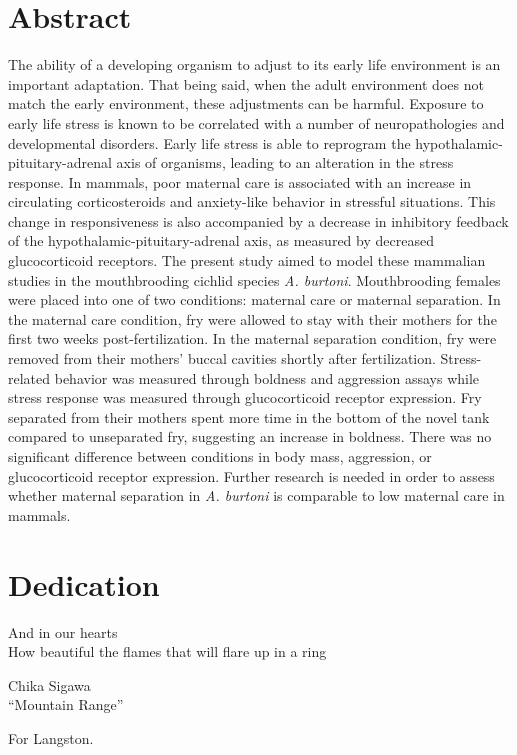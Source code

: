 \documentclass[12pt,twoside]{reedthesis}
\begin{document}
    \tableofcontents
    \listoftables
    \listoffigures

    \chapter*{Abstract}
	The ability of a developing organism to adjust to its early life environment is an
  important adaptation. That being said, when the adult environment does not
  match the early environment, these adjustments can be harmful. Exposure to
  early life stress is known to be correlated with a number of neuropathologies
  and developmental disorders. Early life stress is able to
  reprogram the hypothalamic-pituitary-adrenal axis of organisms, leading to an
  alteration in the stress response. In mammals, poor maternal care is associated
  with an increase in circulating corticosteroids and anxiety-like behavior in stressful situations. This change in
  responsiveness is also accompanied by a decrease in inhibitory feedback of the
  hypothalamic-pituitary-adrenal axis, as measured by decreased glucocorticoid
  receptors. The present study aimed to model these mammalian studies in the
  mouthbrooding cichlid species \textit{A. burtoni}. Mouthbrooding females were
  placed into one of two conditions: maternal care or maternal separation. In
  the maternal care condition, fry were allowed to stay with their mothers for
  the first two weeks post-fertilization. In the maternal separation condition,
  fry were removed from their mothers' buccal cavities shortly after
  fertilization. Stress-related behavior was measured through boldness and
  aggression assays while stress response was measured through glucocorticoid
  receptor expression. Fry separated from their mothers spent more time in the
  bottom of the novel tank compared to unseparated fry, suggesting an increase
  in boldness. There was no significant difference between conditions in
  body mass, aggression, or glucocorticoid receptor expression. Further research
  is needed in order to assess whether maternal separation in \textit{A.
    burtoni} is comparable to low maternal care in mammals. 
    
	\chapter*{Dedication}
  \epigraph{And in our hearts\\ How beautiful the flames that will flare up in a
    ring}{Chika Sigawa \\ ``Mountain Range''}
For Langston.
  \mainmatter %
  \pagestyle{fancyplain} %
\end{document}

